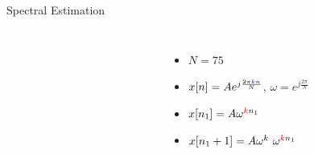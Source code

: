 \documentclass[10pt,xcolor=table]{beamer}
\begin{document}
\begin{frame}{Spectral Estimation}
	
	\begin{columns}
		
		\begin{figure}
			\centering
			\scalebox{0.60}{}
		\end{figure}
		
		\begin{figure}
			\centering
			\scalebox{0.60}{}
		\end{figure}

        \begin{itemize}
        \item $N=75$
        \item $x[n] = A e^{j \frac{2 \pi {\color{blue}{k}} n}{N}}$, $\omega = e^{j \frac{2 \pi}{N}}$
        \item $x[n_1] = A \omega^{{\color{red}{k}}n_1}$
        \item $x[n_1+1] = A \omega^k \ \omega^{{\color{red}{k}}n_1}$
		\end{itemize}
	\end{columns}	
\end{frame}
\end{document}
